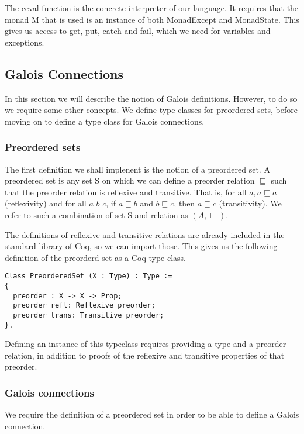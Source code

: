 The ceval function is the concrete interpreter of our language. It requires
that the monad M that is used is an instance of both MonadExcept and
MonadState. This gives us access to get, put, catch and fail, which we need for
variables and exceptions.

\subsection{Galois Connections}
In this section we will describe the notion of Galois definitions. However, to
do so  we require some other concepts. We define type classes for
preordered sets, before moving on to define a type class for Galois
connections.

\subsubsection{Preordered sets}
The first definition we shall implenent is the notion of a preordered set. 
A preordered set is any set S on which we can define a preorder relation
$\sqsubseteq$ such that the preorder relation is reflexive and transitive. That
is, for all $a, a \sqsubseteq a$ (reflexivity) and for all $a$ $b$ $c$, if $a
\sqsubseteq b$ and $b \sqsubseteq c$, then $a \sqsubseteq c$ (transitivity).
We refer to such a combination of set S and relation as $(A, \sqsubseteq)$.

The definitions of reflexive and transitive relations are already included in
the standard library of Coq, so we can import those. This gives us the
following definition of the preorderd set as a Coq type class.

\begin{listing}
\begin{verbatim}
Class PreorderedSet (X : Type) : Type :=
{
  preorder : X -> X -> Prop;
  preorder_refl: Reflexive preorder;
  preorder_trans: Transitive preorder;
}.
\end{verbatim}
\end{listing}

Defining an instance of this typeclass requires providing a type and a preorder
relation, in addition to proofs of the reflexive and transitive properties of
that preorder. 

\subsubsection{Galois connections}
We require the definition of a preordered set in order to be able to define a
Galois connection.

